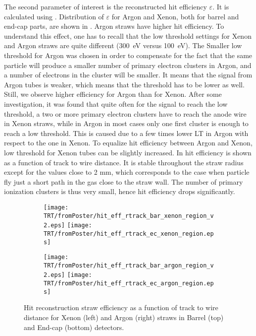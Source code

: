The second parameter of interest is the reconstructed hit efficiency $\varepsilon$. It is calculated using .
Distribution of $\varepsilon$ for Argon and Xenon, both for barrel and end-cap parts, are shown in .
Argon straws have higher hit efficiency. To understand this effect, one has to recall that the low threshold settings
for Xenon and Argon straws are quite different (300~eV versus 100~eV). The Smaller low threshold for Argon was chosen in order to compensate for the fact that the same particle will produce a smaller number of primary electron clusters in Argon, 
and a number of electrons in the cluster will be smaller. It means that the signal from Argon tubes is weaker, which means
that the threshold has to be lower as well. Still, we observe higher efficiency for Argon than for Xenon. After some investigation, it was found that quite often for the signal to reach the low threshold, a two or more primary electron clusters have to reach the anode wire in
Xenon straws, while in Argon in most cases only one first cluster is enough to reach a low threshold. This is caused due to a few times lower LT in Argon with respect to the one in Xenon.
To equalize hit efficiency between Argon and Xenon, low threshold for Xenon tubes can be slightly increased.
In  hit efficiency is shown as a function of track to wire distance. 
It is stable throughout the straw radius except for the values close to 2 mm, which corresponds
to the case when particle fly just a short path in the gas close to the straw wall. 
The number of primary ionization clusters is thus very small, hence hit efficiency drops significantly.

\begin{figure}

\begin{subfigure}{.5\textwidth}
  \centering
  \texttt{[image: TRT/fromPoster/hit\_eff\_rtrack\_bar\_xenon\_region\_v2.eps]}
  \texttt{[image: TRT/fromPoster/hit\_eff\_rtrack\_ec\_xenon\_region.eps]}
\end{subfigure}%
\begin{subfigure}{.5\textwidth}
  \centering
  \texttt{[image: TRT/fromPoster/hit\_eff\_rtrack\_bar\_argon\_region\_v2.eps]}
  \texttt{[image: TRT/fromPoster/hit\_eff\_rtrack\_ec\_argon\_region.eps]}
\end{subfigure}

\caption{Hit reconstruction straw efficiency as a function of track to wire distance 
for Xenon (left) and Argon (right) straws in Barrel (top) and End-cap (bottom) detectors.}
  \label{fig:hit_eff_rtrack_bar}
\end{figure}

